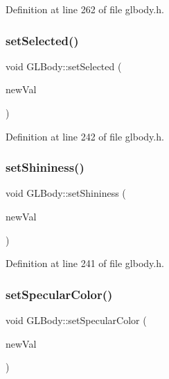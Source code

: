 Definition at line 262 of file glbody.\+h.

\mbox{\label{class_g_l_body_a120b454d3d359022d4e74ba58b9b5a7b}} 
\subsubsection{\texorpdfstring{setSelected()}{setSelected()}}
{\footnotesize\ttfamily void G\+L\+Body\+::set\+Selected (\begin{DoxyParamCaption}\item[{bool}]{new\+Val }\end{DoxyParamCaption})\hspace{0.3cm}{\ttfamily [inline]}}



Definition at line 242 of file glbody.\+h.

\mbox{\label{class_g_l_body_a7f049343daaedfc9672448a8cd4bd3e2}} 
\subsubsection{\texorpdfstring{setShininess()}{setShininess()}}
{\footnotesize\ttfamily void G\+L\+Body\+::set\+Shininess (\begin{DoxyParamCaption}\item[{int}]{new\+Val }\end{DoxyParamCaption})\hspace{0.3cm}{\ttfamily [inline]}}



Definition at line 241 of file glbody.\+h.

\mbox{\label{class_g_l_body_a90028e76cb59d81178a9a73eccffd4b1}} 
\subsubsection{\texorpdfstring{setSpecularColor()}{setSpecularColor()}}
{\footnotesize\ttfamily void G\+L\+Body\+::set\+Specular\+Color (\begin{DoxyParamCaption}\item[{const \mbox{\hyperlink{class_g_l_color_rgba}{G\+L\+Color\+Rgba}} \&}]{new\+Val }\end{DoxyParamCaption})\hspace{0.3cm}{\ttfamily [inline]}}



